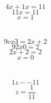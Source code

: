 \documentclass{article}
\begin{document}
\section{}
$$
4x + 1 x = 11
$$
$$
11x = 11
$$
$$
x = 1
$$
\section{}
$$
9c x 3 = 2x + 2
$$
$$
92x 0 = 2
$$
$$
2x + 2 = 2
$$
$$
x = 0
$$
\section{}
$$
1z - - 11
$$
$$
z = \frac{1}{11}
$$
\end{document}

